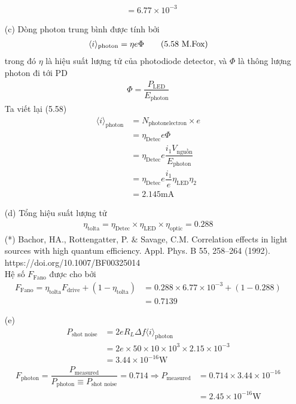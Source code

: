 \documentclass{article}
\newcommand{\f}[2]{\dfrac{#1}{#2}}
\begin{document}
\begin{enumerate}
\begin{align*}
		       & = 6.77 \times 10^{-3}
	      \end{align*}
	\item[(c)] Dòng photon trung bình được tính bởi
	      \begin{align*}
		      \langle i \rangle_{\text{photon}} = \eta e \Phi \tag{5.58 \text{M.Fox}}
	      \end{align*}
	      trong đó $\eta$ là hiệu suất lượng tử của photodiode detector, và $\Phi$ là thông lượng photon đi tới PD\\
	      \begin{align*}
		      \Phi = \f{P_{\text{LED}}}{E_{\text{photon}}}
	      \end{align*}
	      Ta viết lại (5.58)
	      \begin{align*}
		      \langle i \rangle_{\text{photon}}
		       & = N_{\text{photonelectron}} \times e                                  \\
		       & = \eta_{\text{Detec}} e \Phi                                          \\
		       & = \eta_{\text{Detec}} e \f{i_{1} V_{\text{nguồn}}}{E_{\text{photon}}} \\
		       & = \eta_{\text{Detec}} e \f{i_{1}}{e} \eta_{\text{LED}} \eta_{2} \\
		       & = 2.145 \text{mA}
	      \end{align*}
	\item[(d)] Tổng hiệu suất lượng tử
	      \begin{align*}
		      \eta_{\text{tolta}} = \eta_{\text{Detec}} \times \eta_{\text{LED}} \times \eta_{\text{optic}} = 0.288  \tag{*}
	      \end{align*}
	      (*) Bachor, HA., Rottengatter, P. $\&$ Savage, C.M. Correlation effects in light sources with high quantum efficiency. Appl. Phys. B 55, 258–264 (1992).\\ https://doi.org/10.1007/BF00325014 \\
	      Hệ số $F_{\text{Fano}}$ được cho bởi
	      \begin{align*}
		      F_{\text{Fano}} = \eta_{\text{tolta}} F_{\text{drive}} + (1 - \eta_{\text{tolta}})
		       & = 0.288 \times 6.77 \times 10^{-3} + (1 - 0.288) \\
		       & = 0.7139
	      \end{align*}
	\item[(e)]
	      \begin{align*}
		      P_{\text{shot noise}}
		       & = 2 e R_{L} \Delta f \langle i \rangle_{\text{photon}}            \\
		       & = 2e \times 50 \times 10 \times 10^{3} \times 2.15 \times 10^{-3} \\
		       & = 3.44 \times 10^{-16} \text{W} \tag{1}
	      \end{align*}
	      \begin{align*}
		      F_{\text{photon}} = \f{P_\text{measured}}{P_{\text{photon}} \equiv P_{\text{shot noise}} } = 0.714 \Rightarrow P_\text{measured}
		       & = 0.714 \times 3.44 \times 10^{-16} \\
		       & = 2.45 \times 10^{-16} \text{W}
	      \end{align*}
\end{enumerate}
\end{document}
